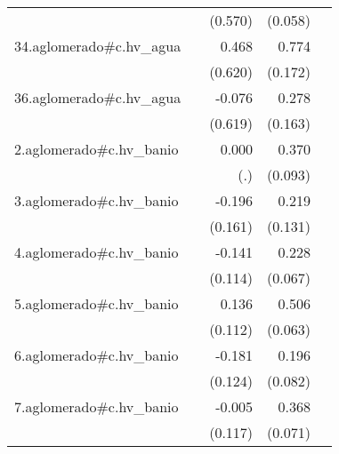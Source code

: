 {\begin{longtable}{l*{4}{D{.}{.}{-1}}}
            &                     &     (0.570)         &     (0.058)         &                     \\
\addlinespace
34.aglomerado#c.hv\_agua&                     &       0.468         &       0.774\sym{***}&                     \\
            &                     &     (0.620)         &     (0.172)         &                     \\
\addlinespace
36.aglomerado#c.hv\_agua&                     &      -0.076         &       0.278         &                     \\
            &                     &     (0.619)         &     (0.163)         &                     \\
\addlinespace
2.aglomerado#c.hv\_banio&                     &       0.000         &       0.370\sym{***}&                     \\
            &                     &         (.)         &     (0.093)         &                     \\
\addlinespace
3.aglomerado#c.hv\_banio&                     &      -0.196         &       0.219         &                     \\
            &                     &     (0.161)         &     (0.131)         &                     \\
\addlinespace
4.aglomerado#c.hv\_banio&                     &      -0.141         &       0.228\sym{***}&                     \\
            &                     &     (0.114)         &     (0.067)         &                     \\
\addlinespace
5.aglomerado#c.hv\_banio&                     &       0.136         &       0.506\sym{***}&                     \\
            &                     &     (0.112)         &     (0.063)         &                     \\
\addlinespace
6.aglomerado#c.hv\_banio&                     &      -0.181         &       0.196\sym{*}  &                     \\
            &                     &     (0.124)         &     (0.082)         &                     \\
\addlinespace
7.aglomerado#c.hv\_banio&                     &      -0.005         &       0.368\sym{***}&                     \\
            &                     &     (0.117)         &     (0.071)         &                     \\

\end{longtable}}
